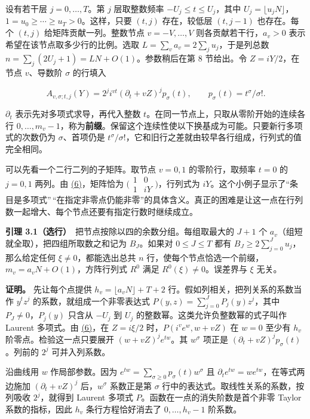 \documentclass[11pt,a4paper]{article}
\begin{document}
设有若干层 \(j=0,\ldots,T\)。第 \(j\) 层取整数频率 \(-U_j\le t\le U_j\)，其中 \(U_j=\lfloor u_j N\rfloor\)，\(1=u_0\ge\cdots\ge u_T>0\)。这样，只要 \((t,j)\) 存在，较低层 \((t,j-1)\) 也存在。每个 \((t,j)\) 给矩阵贡献一列。整数节点 \(v=-V,\ldots,V\) 则各贡献若干行，\(a_v>0\) 表示希望在该节点取多少行的比例。选取 \(L=\sum_v a_v=2\sum_j u_j\)，于是列总数 \(n=\sum_j(2U_j+1)=LN+O(1)\)。参数稍后在第 8 节给出。令 \(Z=iY/2\)，在节点 \(v\)、导数阶 \(\sigma\) 的行填入

\[
 A_{v,\sigma;t,j}(Y)=2^j i^{vt}(\partial_t+vZ)^j p_\sigma(t),\qquad
 p_\sigma(t)=t^\sigma/\sigma! .                                           \tag{6}\label{eq:6}
\]

\(\partial_t\) 表示先对多项式求导，再代入整数 \(t\)。在同一节点上，只取从零阶开始的连续各行 \(0,\ldots,m_v-1\)，称为\textbf{前缀}。保留这个连续性使以下换基成为可能。只要新行多项式的次数仍为 \(\sigma\)、首项仍是 \(t^\sigma/\sigma!\)，它和旧行之差就由较早各行组成，行列式的值完全相同。

可以先看一个二行二列的子矩阵。取节点 \(v=0,1\) 的零阶行，取频率 \(t=0\) 的 \(j=0,1\) 两列。由 \hyperref[eq:6]{(6)}，矩阵恰为 \(\bigl(\begin{smallmatrix}1&0\\1&iY\end{smallmatrix}\bigr)\)，行列式为 \(iY\)。这个小例子显示了``条目是多项式''\,``在指定非零点仍能非零''的具体含义。真正的困难是让这一点在行列数一起增大、每个节点还要有指定行数时继续成立。

\textbf{引理 3.1（选行）}　把节点按除以四的余数分组。每组取最大的 \(J+1\) 个 \(a_v\)（组短就全取），把四组所取数之和记为 \(B_J\)。如果对 \(0\le J\le T\) 都有 \(B_J\ge2\sum_{j=0}^J u_j\)，那么给定任何 \(\xi\ne0\)，都能选出总共 \(n\) 行，使每个节点恰选一个前缀，\(m_v=a_vN+O(1)\)，方阵行列式 \(R^0\) 满足 \(R^0(\xi)\ne0\)。误差界与 \(\xi\) 无关。

\textbf{证明。} 先让每个点提供 \(h_v=\lfloor a_vN\rfloor+T+2\) 行。假如列相关，把列关系的系数当作 \(y^t z^j\) 的系数，就组成一个非零表达式 \(P(y,z)=\sum_{j=0}^JP_j(y)z^j\)，其中 \(P_J\ne0\)，\(P_j(y)\) 只含从 \(-U_j\) 到 \(U_j\) 的整数幂。这类允许负整数幂的式子叫作 Laurent 多项式。由 \hyperref[eq:6]{(6)}，在 \(Z=i\xi/2\) 时，\(P(i^ve^w,w+vZ)\) 在 \(w=0\) 至少有 \(h_v\) 阶零点。检验这一点只要展开 \((w+vZ)^je^{tw}\)。其 \(w^\sigma\) 项正是 \((\partial_t+vZ)^jp_\sigma(t)\)。列前的 \(2^j\) 可并入列系数。

沿曲线用 \(w\) 作局部参数。因为 \(e^{tw}=\sum_{\sigma\ge0}p_\sigma(t)w^\sigma\) 且 \(\partial_t e^{tw}=we^{tw}\)，在等式两边施加 \((\partial_t+vZ)^j\) 后，\(w^\sigma\) 系数正是第 \(\sigma\) 行中的表达式。取线性关系的系数，按列吸收 \(2^j\)，就得到 Laurent 多项式 \(P\)。函数在一点的消失阶数是首个非零 Taylor 系数的指标，因此 \(h_v\) 条行方程恰好消去了 \(0,\ldots,h_v-1\) 阶系数。
\end{document}
